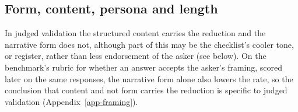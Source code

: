 \subsection{Form, content, persona and length}
\label{app-form}

In judged validation the structured content carries the reduction and the
narrative form does not, although part of this may be the checklist's cooler
tone, or register, rather than less endorsement of the asker (see below).
On the benchmark's rubric for whether an answer accepts the asker's framing,
scored later on the same responses, the narrative form alone also lowers the
rate, so the conclusion that content and not form carries the reduction is
specific to judged validation (Appendix~\ref{app-framing}).

